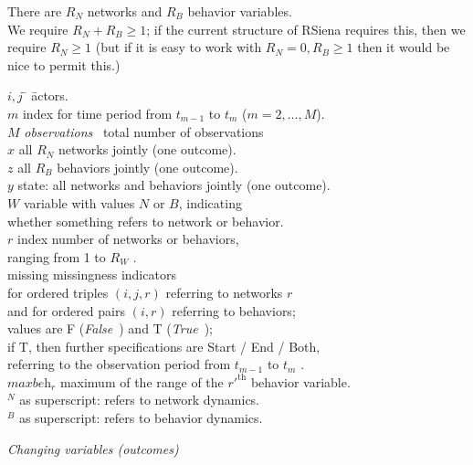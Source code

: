 \documentclass[a4paper,12pt,fleqn]{article}
\newcommand{\maxr}{\textit{maxbeh}_r}
\newcommand{\nnm}[1]{\textsf{\small\textit{#1}\ }}
\begin{document}
There are $R_N$ networks and $R_B$ behavior variables.\\
We require $R_N + R_B \geq 1$; if the current structure of RSiena
requires this, then we require $R_N \geq 1$ (but if it is easy to
work with $R_N = 0, R_B \geq 1$ then it would be nice to permit this.)
\begin{tabbing}
$i, j$ \hspace*{1em} \=  \hspace*{6em} \=  actors.\\[1ex]
$m$ \> \> index for time period from $t_{m-1}$ to $t_m$ ($m = 2, \ldots, M$).  \\[1ex]
$M$ \> \nnm{observations}   \> total number of observations\\[1ex]
$x$ \> \> all $R_N$ networks jointly (one outcome).\\[1ex]
$z$ \> \> all $R_B$ behaviors jointly (one outcome).\\[1ex]
$y$ \> \> state: all networks and behaviors jointly (one outcome).\\[1ex]
$W$ \> \> variable with values $N$ or $B$, indicating \\
    \> \> whether something refers to network or behavior.\\[1ex]
$r$ \> \> index number of networks or behaviors,\\
    \> \> ranging from 1 to $R_W$ .\\[1ex]
missing \> \> missingness indicators \\
        \> \>  for ordered triples $(i,j,r)$ referring to networks $r$ \\
        \> \> and for ordered pairs $(i,r)$ referring to behaviors;\\
        \> \> values are F (\nnm{False}) and T (\nnm{True});\\
        \> \> if T, then further specifications are Start / End / Both,\\
        \> \> referring to the observation period from $t_{m-1}$ to $t_m$ .\\[1ex]
$\maxr$ \> \> maximum of the range of the $r'^{\text{th}}$ behavior variable.\\[1ex]
$^N$ \> \> as superscript: refers to network dynamics.\\[1ex]
$^B$ \> \> as superscript: refers to behavior dynamics.\\[1ex]
\end{tabbing}
\medskip

\emph{Changing variables (outcomes)}
\end{document}
